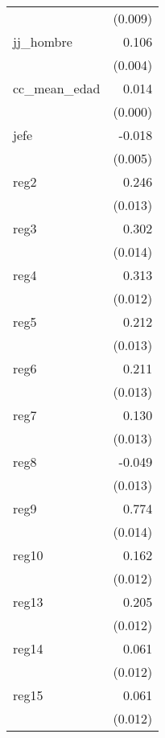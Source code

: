 {\begin{longtable}{l*{1}{D{.}{.}{-1}}}
            &     (0.009)         \\
\addlinespace
jj\_hombre   &       0.106\sym{***}\\
            &     (0.004)         \\
\addlinespace
cc\_mean\_edad&       0.014\sym{***}\\
            &     (0.000)         \\
\addlinespace
jefe        &      -0.018\sym{***}\\
            &     (0.005)         \\
\addlinespace
reg2        &       0.246\sym{***}\\
            &     (0.013)         \\
\addlinespace
reg3        &       0.302\sym{***}\\
            &     (0.014)         \\
\addlinespace
reg4        &       0.313\sym{***}\\
            &     (0.012)         \\
\addlinespace
reg5        &       0.212\sym{***}\\
            &     (0.013)         \\
\addlinespace
reg6        &       0.211\sym{***}\\
            &     (0.013)         \\
\addlinespace
reg7        &       0.130\sym{***}\\
            &     (0.013)         \\
\addlinespace
reg8        &      -0.049\sym{***}\\
            &     (0.013)         \\
\addlinespace
reg9        &       0.774\sym{***}\\
            &     (0.014)         \\
\addlinespace
reg10       &       0.162\sym{***}\\
            &     (0.012)         \\
\addlinespace
reg13       &       0.205\sym{***}\\
            &     (0.012)         \\
\addlinespace
reg14       &       0.061\sym{***}\\
            &     (0.012)         \\
\addlinespace
reg15       &       0.061\sym{***}\\
            &     (0.012)         \\

\end{longtable}}
